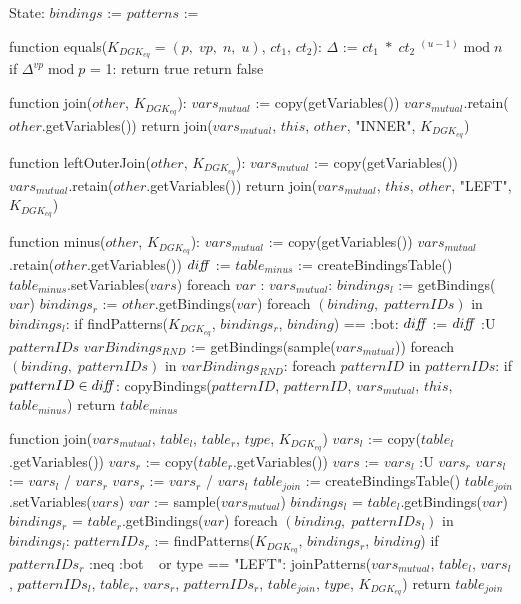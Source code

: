 State:
    $bindings$ := {}
    $patterns$ := {}

function equals($K_{DGK_{eq}} = (p, \; vp, \; n, \; u)$, $ct_1$, $ct_2$):
    $\Delta$ := $ct_1 \; * \; ct_2\;^{(u - 1)} \; \textrm{mod} \; n$
    if $\Delta^{vp} \; \textrm{mod} \; p$ = 1:
        return true
    return false

function join($other$, $K_{DGK_{eq}}$):
    $vars_{mutual}$ := copy(getVariables())
    $vars_{mutual}$.retain($other$.getVariables())
    return join($vars_{mutual}$, $this$, $other$, "INNER", $K_{DGK_{eq}}$)

function leftOuterJoin($other$, $K_{DGK_{eq}}$): 
    $vars_{mutual}$ := copy(getVariables())
    $vars_{mutual}$.retain($other$.getVariables())
    return join($vars_{mutual}$, $this$, $other$, "LEFT", $K_{DGK_{eq}}$)

function minus($other$, $K_{DGK_{eq}}$):
    $vars_{mutual}$ := copy(getVariables())
    $vars_{mutual}$.retain($other$.getVariables())
    $di\textrm{\emph{ff}}$ := {}
    $table_{minus}$ := createBindingsTable()
    $table_{minus}$.setVariables($vars$)
    foreach $var$ : $vars_{mutual}$:
        $bindings_l$ := getBindings($var$)
        $bindings_r$ := $other$.getBindings($var$)
        foreach $(binding, \; patternIDs)$ in $bindings_l$:
            if findPatterns($K_{DGK_{eq}}$, $bindings_r$, $binding$) == :bot:
                $di\textrm{\emph{ff}}$ := $di\textrm{\emph{ff}}$ :U $patternIDs$
    $varBindings_{RND}$ := getBindings(sample($vars_{mutual}$))
    foreach $(binding, \; patternIDs)$ in $varBindings_{RND}$:
        foreach $patternID$ in $patternIDs$:
            if $patternID \in di\textrm{\emph{ff}}$:
                copyBindings($patternID$, $patternID$, $vars_{mutual}$, $this$, $table_{minus}$)
    return $table_{minus}$

function join($vars_{mutual}$, $table_l$, $table_r$, $type$, $K_{DGK_{eq}}$) 
    $vars_l$ := copy($table_l$.getVariables())
    $vars_r$ := copy($table_r$.getVariables())
    $vars$ := $vars_l$ :U $vars_r$
    $vars_l$ := $vars_l$ / $vars_r$
    $vars_r$ := $vars_r$ / $vars_l$
    $table_{join}$ := createBindingsTable()
    $table_{join}$.setVariables($vars$)
    $var$ := sample($vars_{mutual}$) 
    $bindings_l$ = $table_l$.getBindings($var$)
    $bindings_r$ = $table_r$.getBindings($var$)
    foreach $(binding, \; patternIDs_l)$ in $bindings_l$: 
        $patternIDs_r$ := findPatterns($K_{DGK_{eq}}$, $bindings_r$, $binding$)
        if $patternIDs_r$ :neq :bot $\:\:$ or type == "LEFT":
            joinPatterns($vars_{mutual}$, $table_l$, $vars_l$, $patternIDs_l$, $table_r$, $vars_r$, $patternIDs_r$, $table_{join}$, $type$, $K_{DGK_{eq}}$)
    return $table_{join}$

